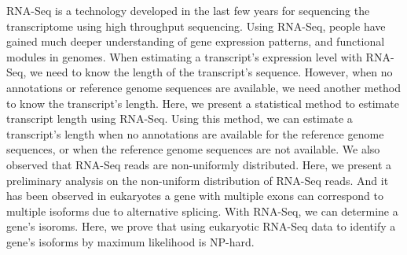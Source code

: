 
\begin{eabstract} 
	RNA-Seq is a technology developed in the last few years for sequencing the transcriptome using high throughput sequencing. 
	Using RNA-Seq, people have gained much deeper understanding of gene expression patterns, 
	and functional modules in genomes. 
	When estimating a transcript's expression level with RNA-Seq, 
	we need to know the length of the transcript's sequence. 
	However, when no annotations or reference genome sequences are available, 
	we need another method to know the transcript's length. 
	Here, we present a statistical method to estimate transcript length using RNA-Seq. 
	Using this method, we can estimate a transcript's length when no annotations are available for the reference genome sequences, or when the reference genome sequences are not available. 
	We also observed that RNA-Seq reads are non-uniformly distributed. 
	Here, we present a preliminary analysis on the non-uniform distribution of RNA-Seq reads. 
	And it has been observed in eukaryotes a gene with multiple exons can correspond to multiple isoforms due to alternative splicing. With RNA-Seq, we can determine a gene's isoroms. 
	Here, we prove that using eukaryotic RNA-Seq data to identify a gene's isoforms by maximum likelihood is NP-hard.
\end{eabstract}




